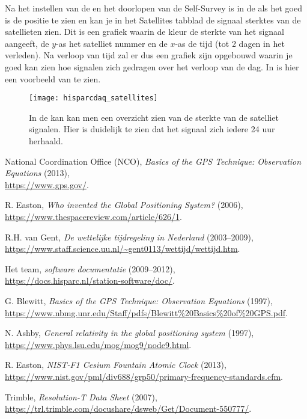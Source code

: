 Na het instellen van de \gps en het doorlopen van de Self-Survey is in
de \hisparc \daq als het goed is de \gps positie te zien en kan je in
het Satellites tabblad de signaal sterktes van de satellieten zien. Dit
is een grafiek waarin de kleur de sterkte van het signaal aangeeft, de
$y$-as het satelliet nummer en de $x$-as de tijd (tot 2 dagen in het
verleden). Na verloop van tijd zal er dus een grafiek zijn opgebouwd
waarin je goed kan zien hoe \gps signalen zich gedragen over het verloop
van de dag. In  is hier een voorbeeld
van te zien.

\begin{figure}
    \centering
    \texttt{[image: hisparcdaq\_satellites]}
    \caption{In de \hisparc \daq kan kan men een overzicht zien van de
    sterkte van de satelliet signalen. Hier is duidelijk te zien dat het
    signaal zich iedere 24 uur herhaald.}
    \label{fig:hisparcdaq_satellites}
\end{figure}

\begin{thebibliography}{9}
     National Coordination Office (NCO), \emph{Basics
    of the GPS Technique: Observation Equations} (2013),\\
    \url{https://www.gps.gov/}.

     R. Easton, \emph{Who invented the Global
    Positioning System?} (2006),\\
    \url{https://www.thespacereview.com/article/626/1}.

     R.H. van Gent, \emph{De wettelijke
    tijdregeling in Nederland} (2003--2009),\\
    \url{https://www.staff.science.uu.nl/~gent0113/wettijd/wettijd.htm}.

     Het \hisparc team, \emph{\hisparc
    software documentatie} (2009--2012),\\
    \url{https://docs.hisparc.nl/station-software/doc/}.

     G. Blewitt, \emph{Basics of the GPS
    Technique: Observation Equations} (1997),\\
    \url{https://www.nbmg.unr.edu/Staff/pdfs/Blewitt%20Basics%20of%20GPS.pdf}.

     N. Ashby, \emph{General relativity in the
    global positioning system} (1997),\\
    \url{https://www.phys.lsu.edu/mog/mog9/node9.html}.

     R. Easton, \emph{NIST-F1 Cesium Fountain
    Atomic Clock} (2013),\\
    \url{https://www.nist.gov/pml/div688/grp50/primary-frequency-standards.cfm}.

     Trimble, \emph{Resolution-T Data Sheet}
    (2007),\\
    \url{https://trl.trimble.com/docushare/dsweb/Get/Document-550777/}.
\end{thebibliography}


